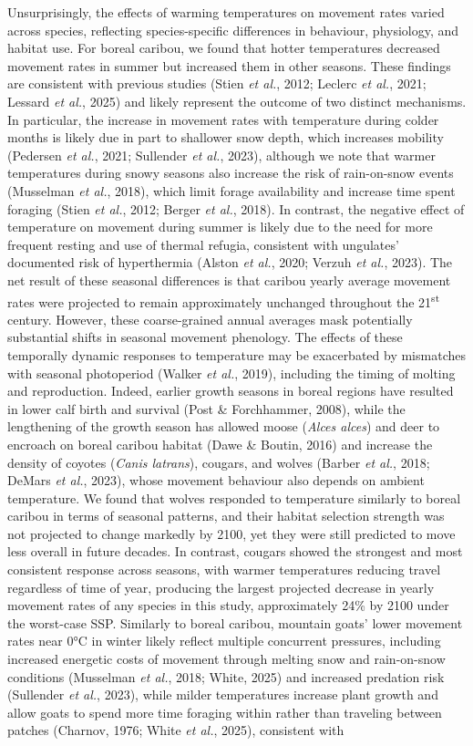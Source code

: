 \documentclass[
  12pt,
]{article}
\begin{document}
Unsurprisingly, the effects of warming temperatures on movement rates varied across species, reflecting species-specific differences in behaviour, physiology, and habitat use. For boreal caribou, we found that hotter temperatures decreased movement rates in summer but increased them in other seasons. These findings are consistent with previous studies (Stien \emph{et al.}, 2012; Leclerc \emph{et al.}, 2021; Lessard \emph{et al.}, 2025) and likely represent the outcome of two distinct mechanisms. In particular, the increase in movement rates with temperature during colder months is likely due in part to shallower snow depth, which increases mobility (Pedersen \emph{et al.}, 2021; Sullender \emph{et al.}, 2023), although we note that warmer temperatures during snowy seasons also increase the risk of rain-on-snow events (Musselman \emph{et al.}, 2018), which limit forage availability and increase time spent foraging (Stien \emph{et al.}, 2012; Berger \emph{et al.}, 2018). In contrast, the negative effect of temperature on movement during summer is likely due to the need for more frequent resting and use of thermal refugia, consistent with ungulates' documented risk of hyperthermia (Alston \emph{et al.}, 2020; Verzuh \emph{et al.}, 2023). The net result of these seasonal differences is that caribou yearly average movement rates were projected to remain approximately unchanged throughout the 21\textsuperscript{st} century. However, these coarse-grained annual averages mask potentially substantial shifts in seasonal movement phenology. The effects of these temporally dynamic responses to temperature may be exacerbated by mismatches with seasonal photoperiod (Walker \emph{et al.}, 2019), including the timing of molting and reproduction. Indeed, earlier growth seasons in boreal regions have resulted in lower calf birth and survival (Post \& Forchhammer, 2008), while the lengthening of the growth season has allowed moose (\emph{Alces alces}) and deer to encroach on boreal caribou habitat (Dawe \& Boutin, 2016) and increase the density of coyotes (\emph{Canis latrans}), cougars, and wolves (Barber \emph{et al.}, 2018; DeMars \emph{et al.}, 2023), whose movement behaviour also depends on ambient temperature. We found that wolves responded to temperature similarly to boreal caribou in terms of seasonal patterns, and their habitat selection strength was not projected to change markedly by 2100, yet they were still predicted to move less overall in future decades. In contrast, cougars showed the strongest and most consistent response across seasons, with warmer temperatures reducing travel regardless of time of year, producing the largest projected decrease in yearly movement rates of any species in this study, approximately 24\% by 2100 under the worst-case SSP. Similarly to boreal caribou, mountain goats' lower movement rates near 0°C in winter likely reflect multiple concurrent pressures, including increased energetic costs of movement through melting snow and rain-on-snow conditions (Musselman \emph{et al.}, 2018; White, 2025) and increased predation risk (Sullender \emph{et al.}, 2023), while milder temperatures increase plant growth and allow goats to spend more time foraging within rather than traveling between patches (Charnov, 1976; White \emph{et al.}, 2025), consistent with 
\end{document}
